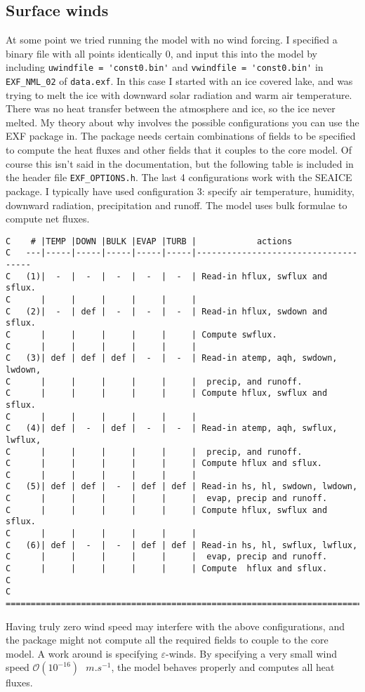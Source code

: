 \documentclass[11pt]{article}
\begin{document}
\subsection{Surface winds}
\label{sec:epsilonWinds}
At some point we tried running the model with no wind forcing. I specified a binary file with all points identically 0, and input this into the model by including \verb|uwindfile = 'const0.bin'| and \verb|vwindfile = 'const0.bin'| in \verb|EXF_NML_02| of \verb|data.exf|. In this case I started with an ice covered lake, and was trying to melt the ice with downward solar radiation and warm air temperature. There was no heat transfer between the atmosphere and ice, so the ice never melted. My theory about why involves the possible configurations you can use the EXF package in. The package needs certain combinations of fields to be specified to compute the heat fluxes and other fields that it couples to the core model. Of course this isn't said in the documentation, but the following table is included in the header file \verb|EXF_OPTIONS.h|. The last 4 configurations work with the SEAICE package. I typically have used configuration 3: specify air temperature, humidity, downward radiation, precipitation and runoff. The model uses bulk formulae to compute net fluxes.

\begin{lstlisting}[caption={Available configurations for running the EXF package}]
C    # |TEMP |DOWN |BULK |EVAP |TURB |            actions
C   ---|-----|-----|-----|-----|-----|-------------------------------------
C   (1)|  -  |  -  |  -  |  -  |  -  | Read-in hflux, swflux and sflux.
C      |     |     |     |     |     |
C   (2)|  -  | def |  -  |  -  |  -  | Read-in hflux, swdown and sflux.
C      |     |     |     |     |     | Compute swflux.
C      |     |     |     |     |     |
C   (3)| def | def | def |  -  |  -  | Read-in atemp, aqh, swdown, lwdown,
C      |     |     |     |     |     |  precip, and runoff.
C      |     |     |     |     |     | Compute hflux, swflux and sflux.
C      |     |     |     |     |     |
C   (4)| def |  -  | def |  -  |  -  | Read-in atemp, aqh, swflux, lwflux,
C      |     |     |     |     |     |  precip, and runoff.
C      |     |     |     |     |     | Compute hflux and sflux.
C      |     |     |     |     |     |
C   (5)| def | def |  -  | def | def | Read-in hs, hl, swdown, lwdown,
C      |     |     |     |     |     |  evap, precip and runoff.
C      |     |     |     |     |     | Compute hflux, swflux and sflux.
C      |     |     |     |     |     |
C   (6)| def |  -  |  -  | def | def | Read-in hs, hl, swflux, lwflux,
C      |     |     |     |     |     |  evap, precip and runoff.
C      |     |     |     |     |     | Compute  hflux and sflux.
C
C   =======================================================================
\end{lstlisting}
Having truly zero wind speed may interfere with the above configurations, and the package might not compute all the required fields to couple to the core model. A work around is specifying $\varepsilon$-winds. By specifying a very small wind speed $\mathcal{O}(10^{-16}) \textrm{ } \si{m.s^{-1}}$, the model behaves properly and computes all heat fluxes.
\end{document}

